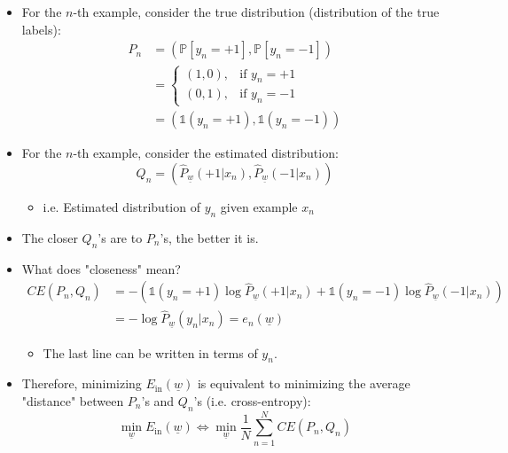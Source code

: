     \begin{derivation}
        \begin{itemize}
            \item For the \(n\)-th example, consider the true distribution (distribution of the true labels):
            \begin{align*}
                P_n &= \left( \mathbb{P}[y_n = +1], \mathbb{P}[y_n = -1] \right) \\
                    &= \begin{cases}
                        (1, 0), & \text{if } y_n = +1 \\
                        (0, 1), & \text{if } y_n = -1
                    \end{cases} \\
                    &= \left( \mathbb{1}(y_n = +1), \mathbb{1}(y_n = -1) \right)
            \end{align*}

            \item For the \(n\)-th example, consider the estimated distribution:
            \[
            Q_n = \left( \hat{P}_{\underline{w}}(+1 | x_n), \hat{P}_{\underline{w}}(-1 | x_n) \right)
            \]
            \begin{itemize}
                \item i.e. Estimated distribution of \(y_n\) given example \(x_n\)
            \end{itemize}
            
        
            \item The closer \( Q_n \)'s are to \( P_n \)'s, the better it is. 
            \item What does "closeness" mean? 
            \begin{align*}
            CE(P_n, Q_n) &= -\left( \mathbb{1}(y_n = +1) \log \hat{P}_{\underline{w}}(+1 | x_n) + \mathbb{1}(y_n = -1) \log \hat{P}_{\underline{w}}(-1 | x_n) \right)\\ 
            &= -\log \hat{P}_{\underline{w}}(y_n | x_n) = e_n(\underline{w})
            \end{align*}
            \begin{itemize}
                \item The last line can be written in terms of $y_n$.
            \end{itemize}
        
            \item Therefore, minimizing \(E_{\text{in}}(\underline{w})\) is equivalent to minimizing the average "distance" between \( P_n \)'s and \( Q_n \)'s (i.e. cross-entropy):
            \[
            \min_{\underline{w}} E_{\text{in}}(\underline{w}) \iff \min_{\underline{w}} \frac{1}{N} \sum_{n=1}^{N} CE(P_n, Q_n)
            \]
        \end{itemize}
        

        
    \end{derivation}

    